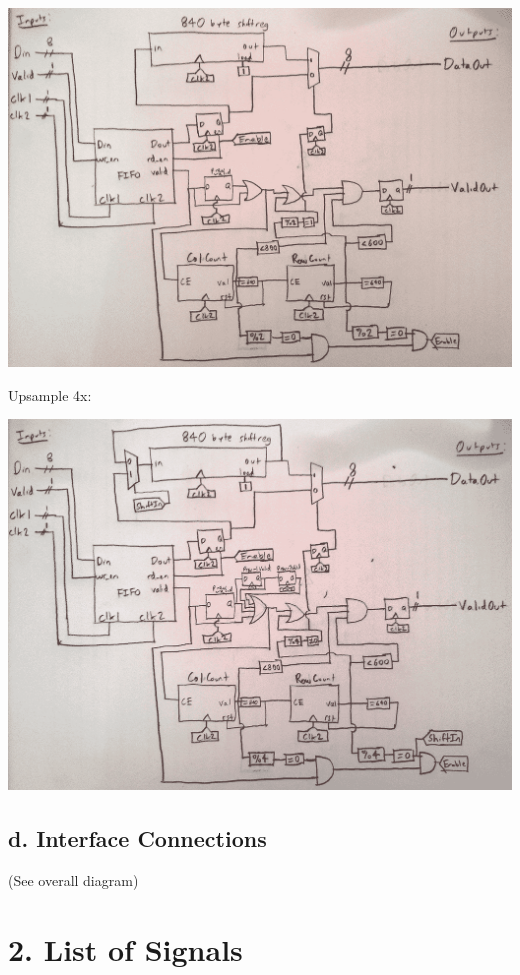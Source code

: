 \documentclass[11pt]{article}
\begin{document}
\noindent\includegraphics[width=\textwidth]{modules/procupsample2x.png}

\newpage

\noindent Upsample 4x: \newline

\noindent\includegraphics[width=\textwidth]{modules/procupsample4x.png}

\subsection*{d. Interface Connections}

(See overall diagram)

\section*{2. List of Signals}
\end{document}
